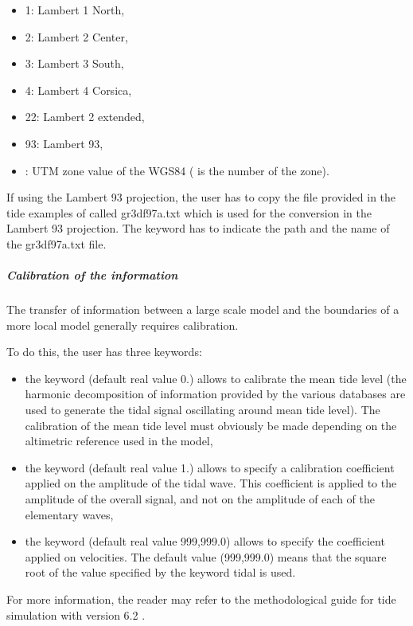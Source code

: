 \begin{itemize}
\item 1: Lambert 1 North,

\item 2: Lambert 2 Center,

\item 3: Lambert 3 South,

\item 4: Lambert 4 Corsica,

\item 22: Lambert 2 extended,

\item 93: Lambert 93,

\item {}: UTM zone value of the WGS84 (
is the number of the zone).
\end{itemize}


If using the Lambert 93 projection, the user has to copy the file provided
in the tide examples of  called gr3df97a.txt which is used
for the conversion in the Lambert 93 projection.
The keyword  has to indicate the path
and the name of the gr3df97a.txt file.

\subparagraph{Calibration of the information}

The transfer of information between a large scale model and the boundaries of
a more local model generally requires calibration.

To do this, the user has three keywords:

\begin{itemize}
\item the keyword  (default real
value 0.) allows to calibrate the mean tide level (the harmonic decomposition
of information provided by the various databases are used to generate the tidal
signal oscillating around mean tide level).
The calibration of the mean tide level must obviously be made depending on the
altimetric reference used in the model,

\item the keyword  (default real
value 1.) allows to specify a calibration coefficient applied on the amplitude
of the tidal wave.
This coefficient is applied to the amplitude of the overall signal, and not on
the amplitude of each of the elementary waves,

\item the keyword 
(default real value 999,999.0) allows to specify the coefficient applied on
velocities.
The default value (999,999.0) means that the square root of the value specified
by the keyword  tidal is used.
\end{itemize}

For more information, the reader may refer to the methodological guide
for tide simulation with version 6.2 \cite{Pham2012}.
